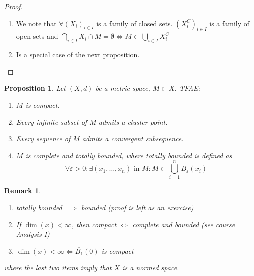 \documentclass{article}
\newcounter{lecref}[section]
\numberwithin{lecref}{section}
\newtheorem*{Remark}{Remark}
\newtheorem{proposition}[lecref]{Proposition}
\begin{document}
\begin{proof}
	\begin{enumerate}
		\item We note that $\forall (X_i)_{i \in I}$ is a family of closed sets.
			$(X_i^C)_{i \in I}$ is a family of open sets and $\bigcap_{i \in I} X_i \cap M = \emptyset \iff M \subset \bigcup_{i \in I} X_i^C$
		\item Is a special case of the next proposition.
	\end{enumerate}
\end{proof}

\begin{proposition}
	\label{proposition:1.19}
	Let $(X, d)$ be a metric space, $M \subset X$. TFAE:
	\begin{enumerate}
		\item $M$ is compact.
		\item Every infinite subset of $M$ admits a cluster point.
		\item Every sequence of $M$ admits a convergent subsequence.
		\item $M$ is complete and totally bounded, where totally bounded is defined as
			\[ \forall \varepsilon > 0: \exists (x_1, \dots, x_n) \text{ in } M: M \subset \bigcup_{i=1}^n B_\varepsilon(x_i) \]
	\end{enumerate}
\end{proposition}

\begin{Remark}
	\begin{enumerate}
		\item totally bounded $\implies$ bounded (proof is left as an exercise)
		\item If $\dim(x) < \infty$, then compact $\iff$ complete and bounded (see course Analysis I)
		\item $\dim(x) < \infty \iff \overline{B_1}(0)$ is compact
	\end{enumerate}
	where the last two items imply that $X$ is a normed space.
\end{Remark}
\end{document}
